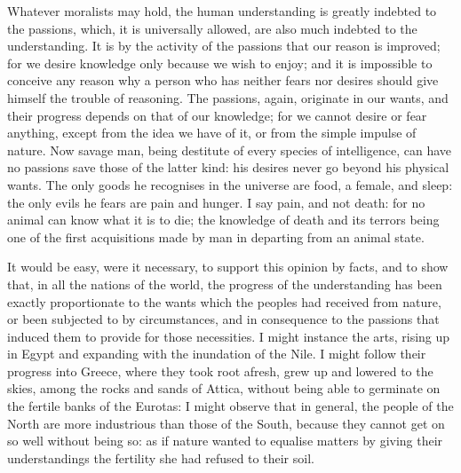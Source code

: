 \documentclass[12pt]{report}
\begin{document}
Whatever moralists may hold, the human understanding is greatly indebted to the passions, which, it is universally allowed, are also much indebted to the understanding. It is by the activity of the passions that our reason is improved; for we desire knowledge only because we wish to enjoy; and it is impossible to conceive any reason why a person who has neither fears nor desires should give himself the trouble of reasoning. The passions, again, originate in our wants, and their progress depends on that of our knowledge; for we cannot desire or fear anything, except from the idea we have of it, or from the simple impulse of nature. Now savage man, being destitute of every species of intelligence, can have no passions save those of the latter kind: his desires never go beyond his physical wants. The only goods he recognises in the universe are food, a female, and sleep: the only evils he fears are pain and hunger. I say pain, and not death: for no animal can know what it is to die; the knowledge of death and its terrors being one of the first acquisitions made by man in departing from an animal state.

It would be easy, were it necessary, to support this opinion by facts, and to show that, in all the nations of the world, the progress of the understanding has been exactly proportionate to the wants which the peoples had received from nature, or been subjected to by circumstances, and in consequence to the passions that induced them to provide for those necessities. I might instance the arts, rising up in Egypt and expanding with the inundation of the Nile. I might follow their progress into Greece, where they took root afresh, grew up and lowered to the skies, among the rocks and sands of Attica, without being able to germinate on the fertile banks of the Eurotas: I might observe that in general, the people of the North are more industrious than those of the South, because they cannot get on so well without being so: as if nature wanted to equalise matters by giving their understandings the fertility she had refused to their soil.
\end{document}
